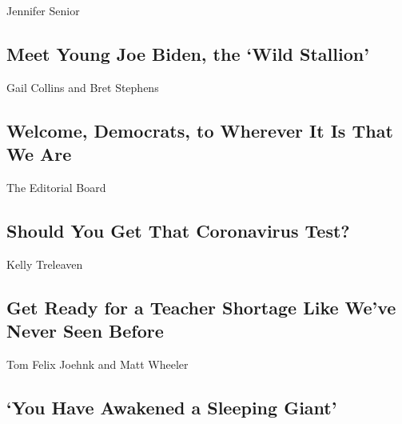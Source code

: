 \href{/2020/08/15/opinion/joe-biden-2020-1988-what-it-takes.html}{}

Jennifer Senior

\hypertarget{meet-young-joe-biden-the-wild-stallion}{%
\subsection{Meet Young Joe Biden, the `Wild
Stallion'}\label{meet-young-joe-biden-the-wild-stallion}}

\href{/2020/08/17/opinion/trump-biden-harris-democratic-convention.html}{}

Gail Collins and Bret Stephens

\hypertarget{welcome-democrats-to-wherever-it-is-that-we-are}{%
\subsection{Welcome, Democrats, to Wherever It Is That We
Are}\label{welcome-democrats-to-wherever-it-is-that-we-are}}

\href{/2020/08/16/opinion/us-coronavirus-testing.html}{}

The Editorial Board

\hypertarget{should-you-get-that-coronavirus-test}{%
\subsection{Should You Get That Coronavirus
Test?}\label{should-you-get-that-coronavirus-test}}

\href{/2020/08/17/opinion/coronavirus-schools-teachers.html}{}

Kelly Treleaven

\hypertarget{get-ready-for-a-teacher-shortage-like-weve-never-seen-before}{%
\subsection{Get Ready for a Teacher Shortage Like We've Never Seen
Before}\label{get-ready-for-a-teacher-shortage-like-weve-never-seen-before}}

\href{/2020/08/17/opinion/thailand-protests.html}{}

Tom Felix Joehnk and Matt Wheeler

\hypertarget{you-have-awakened-a-sleeping-giant}{%
\subsection{`You Have Awakened a Sleeping
Giant'}\label{you-have-awakened-a-sleeping-giant}}

